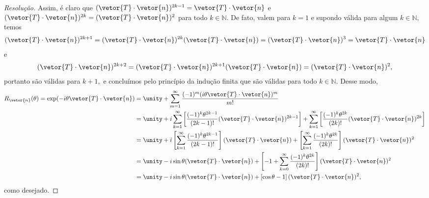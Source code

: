 \begin{proof}[Resolução]
   Assim, é claro que \((\vetor{T} \cdot \vetor{n})^{2k - 1} = \vetor{T} \cdot \vetor{n}\) e \((\vetor{T} \cdot \vetor{n})^{2k} = (\vetor{T} \cdot \vetor{n})^2\) para todo \(k \in \mathbb{N}.\) De fato, valem para \(k = 1\) e supondo válida para algum \(k \in \mathbb{N},\) temos 
   \begin{equation*}
      (\vetor{T} \cdot \vetor{n})^{2k + 1} = (\vetor{T} \cdot \vetor{n})^{2k} (\vetor{T} \cdot \vetor{n}) = (\vetor{T} \cdot \vetor{n})^3 = \vetor{T} \cdot \vetor{n}
   \end{equation*}
   e
   \begin{equation*}
      (\vetor{T} \cdot \vetor{n})^{2k + 2} = (\vetor{T} \cdot \vetor{n})^{2k+1} (\vetor{T} \cdot \vetor{n}) = (\vetor{T} \cdot \vetor{n})^2,
   \end{equation*}
   portanto são válidas para \(k + 1,\) e concluímos pelo princípio da indução finita que são válidas para todo \(k \in \mathbb{N}.\) Desse modo,
   \begin{align*}
      R_{\vetor{n}}(\theta) = \exp( - i\theta \vetor{T} \cdot \vetor{n}) 
      &= \unity + \sum_{m = 1}^\infty \frac{(-1)^m (i \theta \vetor{T} \cdot \vetor{n})^m}{m!}\\
      &= \unity + i\sum_{k = 1}^\infty\left[\frac{(-1)^k \theta^{2k - 1}}{(2k - 1)!} (\vetor{T} \cdot \vetor{n})^{2k - 1}\right] + \sum_{k = 1}^\infty\left[\frac{(-1)^k \theta^{2k}}{(2k)!} (\vetor{T} \cdot \vetor{n})^{2k}\right]\\
      &= \unity + i\left[\sum_{k = 1}^\infty\frac{(-1)^k \theta^{2k - 1}}{(2k - 1)!} \right](\vetor{T} \cdot \vetor{n}) + \left[\sum_{k = 1}^\infty\frac{(-1)^k \theta^{2k}}{(2k)!} \right](\vetor{T} \cdot \vetor{n})^{2}\\
      &= \unity - i \sin\theta (\vetor{T} \cdot \vetor{n}) + \left[-1 + \sum_{k = 0}^\infty \frac{(-1)^k\theta^{2k}}{(2k)!}\right] (\vetor{T} \cdot \vetor{n})^2\\
      &= \unity - i\sin\theta(\vetor{T} \cdot \vetor{n}) + \left[\cos\theta - 1\right] (\vetor{T}\cdot\vetor{n})^2,
   \end{align*}
   como desejado.
\end{proof}
